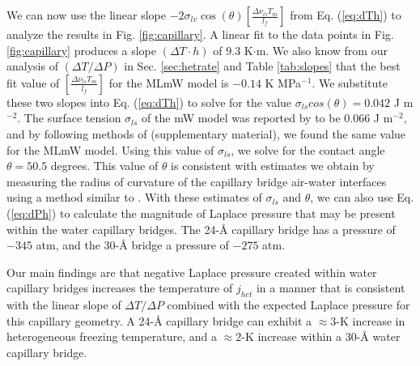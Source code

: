 \documentclass[journal abbreviation, manuscript]{copernicus}
\begin{document}


We can now use the linear slope $-2 \sigma_{lv}\cos(\theta) \left[\frac{\Delta \nu_{ls} T_m }{l_f}\right]$ from Eq. (\ref{eq:dTh}) to analyze the results in Fig. \ref{fig:capillary}. A linear fit to the data points in Fig. \ref{fig:capillary} produces a slope $(\Delta T \cdot h)$ of $9.3$ K$\cdot$m. We also know from our analysis of $(\Delta T/\Delta P)$ in Sec. \ref{sec:hetrate} and Table \ref{tab:slopes} that the best fit value of $\left[\frac{\Delta \nu_{ls} T_m }{l_f}\right]$ for the MLmW model is $-0.14$ K MPa$^{-1}$. We substitute these two slopes into Eq. (\ref{eq:dTh}) to solve for the value $\sigma_{ls} cos(\theta) = 0.042$ J m$^{-2}$. The surface tension $\sigma_{ls}$ of the mW model was reported by \citet{molinero2009} to be $0.066$ J m$^{-2}$, and by following methods of \citet{li2009surface} (supplementary material), we found the same value for the MLmW model. Using this value of $\sigma_{ls}$, we solve for the contact angle $\theta = 50.5$ degrees. This value of $\theta$ is consistent with estimates we obtain by measuring the radius of curvature of the capillary bridge air-water interfaces using a method similar to \citet{giovambattista2007}. With these estimates of $\sigma_{ls}$ and $\theta$, we can also use Eq. (\ref{eq:dPh}) to calculate the magnitude of Laplace pressure that may be present within the water capillary bridges. The 24-\AA{} capillary bridge has a pressure of $-345$ atm, and the 30-\AA{} bridge a pressure of $-275$ atm.

Our main findings are that negative Laplace pressure created within water capillary bridges increases the temperature of $j_{het}$ in a manner that is consistent with the linear slope of $\Delta T/\Delta P$ combined with the expected Laplace pressure for this capillary geometry. A 24-\AA{} capillary bridge can exhibit a $\approx 3$-K increase in heterogeneous freezing temperature, and a $\approx 2$-K increase within a 30-\AA{} water capillary bridge.
\end{document}
